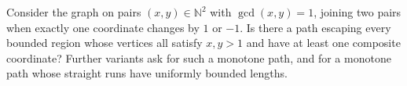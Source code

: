 Consider the graph on pairs $(x,y)\in\mathbb N^2$ with $\gcd(x,y)=1$, joining two pairs when exactly one coordinate changes by $1$ or $-1$. Is there a path escaping every bounded region whose vertices all satisfy $x,y>1$ and have at least one composite coordinate? Further variants ask for such a monotone path, and for a monotone path whose straight runs have uniformly bounded lengths.
